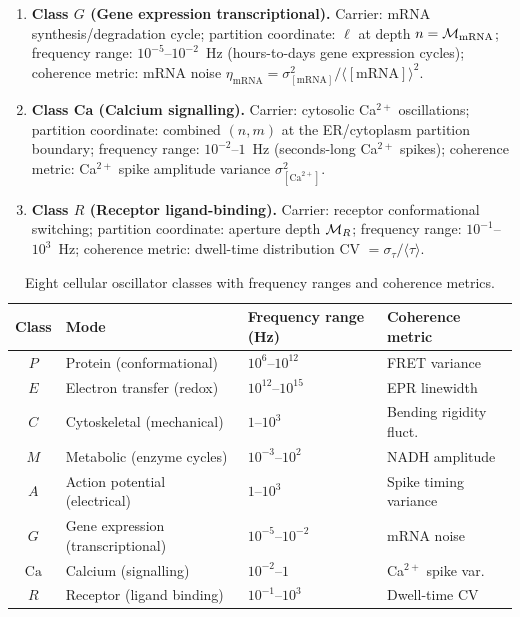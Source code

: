 \begin{definition}
\begin{enumerate}[label=(\alph*)]
    \item \textbf{Class $G$ (Gene expression transcriptional).}  Carrier: mRNA
          synthesis/degradation cycle; partition coordinate: $\ell$ at depth
          $n = \mathcal{M}_\mathrm{mRNA}$; frequency range: $10^{-5}$--$10^{-2}$~Hz
          (hours-to-days gene expression cycles); coherence metric: mRNA noise
          $\eta_\mathrm{mRNA} = \sigma^2_{[\mathrm{mRNA}]}/\langle[\mathrm{mRNA}]\rangle^2$.

    \item \textbf{Class Ca (Calcium signalling).}  Carrier: cytosolic Ca$^{2+}$
          oscillations; partition coordinate: combined $(n, m)$ at the
          ER/cytoplasm partition boundary; frequency range:
          $10^{-2}$--$1$~Hz (seconds-long Ca$^{2+}$ spikes); coherence metric:
          Ca$^{2+}$ spike amplitude variance $\sigma^2_{[\mathrm{Ca}^{2+}]}$.

    \item \textbf{Class $R$ (Receptor ligand-binding).}  Carrier: receptor
          conformational switching; partition coordinate: aperture depth
          $\mathcal{M}_R$; frequency range: $10^{-1}$--$10^3$~Hz; coherence
          metric: dwell-time distribution CV
          $= \sigma_\tau / \langle\tau\rangle$.
\end{enumerate}
\end{definition}

\begin{table}[!htbp]
\centering
\caption{Eight cellular oscillator classes with frequency ranges and coherence metrics.}
\label{tab:oscillators}
\begin{tabular}{clll}
\toprule
\textbf{Class} & \textbf{Mode} & \textbf{Frequency range (Hz)}
    & \textbf{Coherence metric} \\
\midrule
$P$ & Protein (conformational)         & $10^6$--$10^{12}$     & FRET variance \\
$E$ & Electron transfer (redox)        & $10^{12}$--$10^{15}$  & EPR linewidth \\
$C$ & Cytoskeletal (mechanical)        & $1$--$10^3$           & Bending rigidity fluct.\ \\
$M$ & Metabolic (enzyme cycles)        & $10^{-3}$--$10^2$     & NADH amplitude \\
$A$ & Action potential (electrical)    & $1$--$10^3$           & Spike timing variance \\
$G$ & Gene expression (transcriptional)& $10^{-5}$--$10^{-2}$ & mRNA noise \\
$\mathrm{Ca}$ & Calcium (signalling)  & $10^{-2}$--$1$        & Ca$^{2+}$ spike var.\ \\
$R$ & Receptor (ligand binding)        & $10^{-1}$--$10^3$     & Dwell-time CV \\
\bottomrule
\end{tabular}
\end{table}

